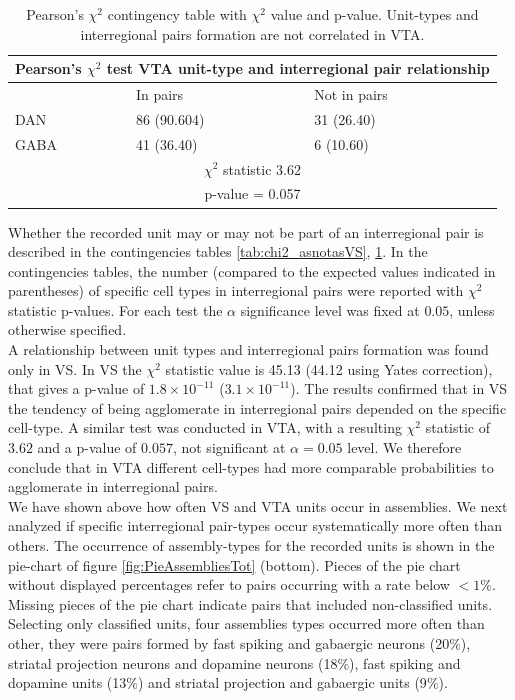 \begin{table}[H]
\begin{tabular}{ |p{3cm}|p{3cm}|p{3cm}| }
 \hline
 \multicolumn{3}{|c|}{Pearson's $\chi^2$ test VTA unit-type and interregional pair relationship} \\
 \hline
 & In pairs & Not in pairs\\
 \hline
 DAN & 86 (90.604) & 31 (26.40) \\
 \hline
 GABA & 41 (36.40) & 6 (10.60)\\
 \hline
 \multicolumn{3}{|c|}{$\chi^2$ statistic  3.62}\\
 \multicolumn{3}{|c|}{p-value = 0.057}\\
 \hline
\end{tabular}
\caption{Pearson's $\chi^2$ contingency table with $\chi^2$ value and p-value. Unit-types and interregional pairs formation are not correlated in VTA.}
\label{tab:chi2_asnotasVTA}
\end{table}
Whether the recorded unit may or may not be part of an interregional pair is described  in the contingencies tables \ref{tab:chi2_asnotasVS}, \ref{tab:chi2_asnotasVTA}. In the contingencies tables, the number (compared to the expected values indicated in parentheses) of specific cell types in interregional pairs were reported with $\chi^2$ statistic p-values. For each test the $\alpha$ significance level was fixed at $0.05$, unless otherwise specified.\\
A relationship between unit types and interregional pairs formation was found only in VS. In VS the $\chi^2$ statistic value is 45.13 (44.12 using Yates correction), that gives a p-value of $1.8\times10^{-11}$ ($3.1\times10^{-11}$). The results confirmed that in VS the tendency of being agglomerate in interregional pairs depended on the specific cell-type. A similar test was conducted in VTA, with a resulting $\chi^2$ statistic of $3.62$ and a p-value of $0.057$, not significant at $\alpha = 0.05$ level. We therefore conclude that in VTA different cell-types had more comparable probabilities to agglomerate in interregional pairs.\\
We have shown above how often VS and VTA units occur in assemblies. We next analyzed if specific interregional pair-types occur systematically more often than others. The occurrence of assembly-types for the recorded units is shown in the pie-chart of figure \ref{fig:PieAssembliesTot} (bottom). Pieces of the pie chart without displayed percentages refer to pairs occurring with a rate below $< 1\%$.  Missing pieces of the pie chart indicate pairs that included non-classified units. Selecting only classified units, four assemblies types occurred more often than other, they were pairs formed by fast spiking and gabaergic neurons (20$\%$), striatal projection neurons and dopamine neurons (18$\%$), fast spiking and dopamine units (13$\%$) and striatal projection and gabaergic units (9$\%$).
